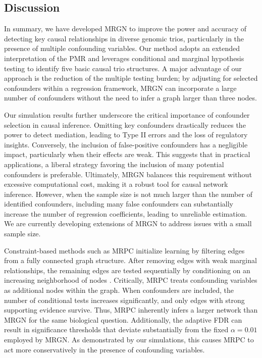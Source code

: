 \documentclass[12pt,letterpaper]{report}
\begin{document}
\begin{doublespace}
\section{Discussion}
In summary, we have developed MRGN to improve the power and accuracy of detecting key causal relationships in diverse genomic trios, particularly in the presence of multiple confounding variables. Our method adopts an extended interpretation of the PMR \cite{badsha2019learning} and leverages conditional and marginal hypothesis testing to identify five basic causal trio structures. A major advantage of our approach is the reduction of the multiple testing burden; by adjusting for selected confounders within a regression framework, MRGN can incorporate a large number of confounders without the need to infer a graph larger than three nodes.  

Our simulation results further underscore the critical importance of confounder selection in causal inference. Omitting key confounders drastically reduces the power to detect mediation, leading to Type II errors and the loss of regulatory insights. Conversely, the inclusion of false-positive confounders has a negligible impact, particularly when their effects are weak. This suggests that in practical applications, a liberal strategy favoring the inclusion of many potential confounders is preferable. Ultimately, MRGN balances this requirement without excessive computational cost, making it a robust tool for causal network inference.  However, when the sample size is not much larger than the number of identified confounders, including many false confounders can substantially increase the number of regression coefficients, leading to unreliable estimation.  We are currently developing extensions of MRGN to address issues with a small sample size.

Constraint-based methods such as MRPC initialize learning by filtering edges from a fully connected graph structure. After removing edges with weak marginal relationships, the remaining edges are tested sequentially by conditioning on an increasing neighborhood of nodes \cite{badsha2019learning, spirtes2000causation}. 
Critically, MRPC treats confounding variables as additional nodes within the graph. When confounders are included, the number of conditional tests increases significantly, and only edges with strong supporting evidence survive. Thus, MRPC inherently infers a larger network than MRGN for the same biological question. Additionally, the adaptive FDR can result in significance thresholds that deviate substantially from the fixed $\alpha = 0.01$ employed by MRGN. As demonstrated by our simulations, this causes MRPC to act more conservatively in the presence of confounding variables.


\end{doublespace}
\end{document}
